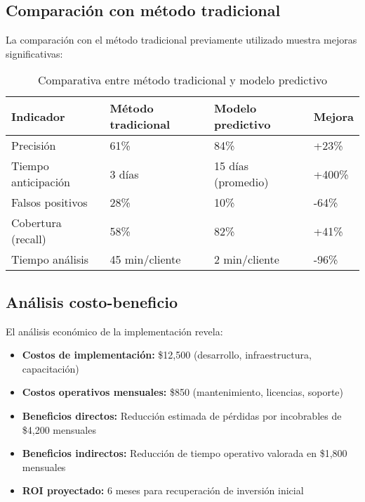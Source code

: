 \subsection{Comparación con método tradicional}
La comparación con el método tradicional previamente utilizado muestra mejoras significativas:

\begin{table}[ht]
\centering
\begin{tabular}{|p{4cm}|p{3cm}|p{3cm}|p{3cm}|}
\hline
\textbf{Indicador} & \textbf{Método tradicional} & \textbf{Modelo predictivo} & \textbf{Mejora} \\
\hline
Precisión & 61\% & 84\% & +23\% \\
\hline
Tiempo anticipación & 3 días & 15 días (promedio) & +400\% \\
\hline
Falsos positivos & 28\% & 10\% & -64\% \\
\hline
Cobertura (recall) & 58\% & 82\% & +41\% \\
\hline
Tiempo análisis & 45 min/cliente & 2 min/cliente & -96\% \\
\hline
\end{tabular}
\caption{Comparativa entre método tradicional y modelo predictivo}
\end{table}

\subsection{Análisis costo-beneficio}
El análisis económico de la implementación revela:

\begin{itemize}
    \item \textbf{Costos de implementación:} \$12,500 (desarrollo, infraestructura, capacitación)
    
    \item \textbf{Costos operativos mensuales:} \$850 (mantenimiento, licencias, soporte)
    
    \item \textbf{Beneficios directos:} Reducción estimada de pérdidas por incobrables de \$4,200 mensuales
    
    \item \textbf{Beneficios indirectos:} Reducción de tiempo operativo valorada en \$1,800 mensuales
    
    \item \textbf{ROI proyectado:} 6 meses para recuperación de inversión inicial
\end{itemize}

